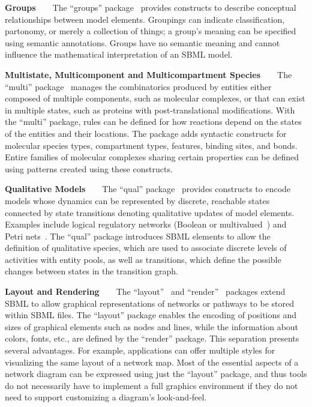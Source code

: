 \documentclass{sbml-paper}
\begin{document}
\textbf{Groups}~~~~The ``groups'' package~\citep{hucka2016sbml} provides constructs to describe conceptual relationships between model elements. Groupings can indicate classification, partonomy, or merely a collection of things; a group's meaning can be specified using semantic annotations.  Groups have no semantic meaning and cannot influence the mathematical interpretation of an SBML model.

\textbf{Multistate, Multicomponent and Multicompartment Species}~~~~The ``multi'' package~\citep{zhang2018multi} manages the combinatorics produced by entities either composed of multiple components, such as molecular complexes, or that can exist in multiple states, such as proteins with post-translational modifications. With the ``multi'' package, rules can be defined for how reactions depend on the states of the entities and their locations. The package adds syntactic constructs for molecular species types, compartment types, features, binding sites, and bonds.  Entire families of molecular complexes sharing certain properties can be defined using patterns created using these constructs.

\textbf{Qualitative Models}~~~~The ``qual'' package~\citep{Chaouiya2015sbml} provides constructs to encode models whose dynamics can be represented by discrete, reachable states connected by state transitions denoting qualitative updates of model elements. Examples include logical regulatory networks (Boolean or multivalued~\citep{abou2016logical}) and Petri nets~\citep{chaouiya2007petri}. The ``qual'' package introduces SBML elements to allow the definition of qualitative species, which are used to associate discrete levels of activities with entity pools, as well as transitions, which define the possible changes between states in the transition graph.

\textbf{Layout and Rendering}~~~~The ``layout''~\citep{Gauges2015} and ``render''~\citep{Bergmann2018sbml} packages extend SBML to allow graphical representations of networks or pathways to be stored within SBML files. The ``layout'' package enables the encoding of positions and sizes of graphical elements such as nodes and lines, while the information about colors, fonts, etc., are defined by the ``render'' package. This separation presents several advantages. For example, applications can offer multiple styles for visualizing the same layout of a network map. Most of the essential aspects of a network diagram can be expressed using just the ``layout'' package, and thus tools do not necessarily have to implement a full graphics environment if they do not need to support customizing a diagram's look-and-feel.
\end{document}
